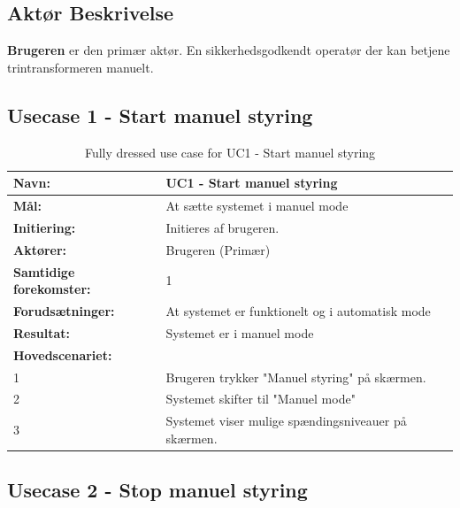 \subsection{Aktør Beskrivelse}
\textbf{Brugeren} er den primær aktør. En sikkerhedsgodkendt operatør der kan betjene trintransformeren manuelt.

\subsection{Usecase 1 - Start manuel styring}
\begin{table}[H]
	\centering
	
	\begin{threeparttable}
		\begin{tabularx}{\linewidth}{ l X }
			\toprule
			\bfseries{Navn:}				& UC1 - Start manuel styring  \\
			\midrule
			\bfseries{Mål:} 				& At sætte systemet i manuel mode \\
			\midrule
			\bfseries{Initiering:} 			& Initieres af brugeren. \\
			\midrule
			\bfseries{Aktører:} 			& Brugeren (Primær) \\
			\midrule
			\bfseries{Samtidige forekomster:} & 1 \\
			\midrule
			\bfseries{Forudsætninger:} 		& At systemet er funktionelt og i automatisk mode\\
			\midrule
			\bfseries{Resultat:} 			& Systemet er i manuel mode \\
			\midrule
			\bfseries{Hovedscenariet:} 	& \\
			
			
			1 	& Brugeren trykker "Manuel styring" på skærmen.\\
			2	& Systemet skifter til "Manuel mode" \\
			3 	& Systemet viser mulige spændingsniveauer på skærmen. 	\\
			
			\bottomrule
			
		\end{tabularx}
	\end{threeparttable}
	\caption{Fully dressed use case for UC1 - Start manuel styring}
	\label{table:UC1}
\end{table}

\subsection{Usecase 2 - Stop manuel styring}

